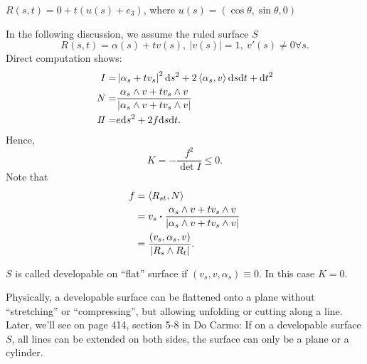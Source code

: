 \begin{example}
    \(R(s,t)=0+t\left(u(s)+e_3\right)\), where \(u(s)=\left(
        \cos\theta,\sin\theta,0
    \right)\)
    \begin{center}
    \end{center}
\end{example}
In the following discussion, we assume the ruled surface \(S\)
\[
    R(s,t)=\alpha(s)+t v(s),~|v(s)|=1,~v'(s)\neq 0\forall s.    
\]
Direct computation shows:
\begin{align*}
    I=&\left|\alpha_s+t v_s\right|^2\dd s^2+2\left\langle
        \alpha_s,v
    \right\rangle \dd s\dd t
    +\dd t^2\\
    N=&\frac{\alpha_s\wedge v+t v_s \wedge v}{
        \left|\alpha_s\wedge v+t v_s \wedge v\right|
    }\\
    I\!I=&e\dd s^2+2f \dd s \dd t .
\end{align*}
Hence,
\[
    K=-\frac{f^2}{\det I}\le 0.    
\]
Note that 
\begin{align*}
    f&=\left\langle R_{st},N\right\rangle\\
    &=v_s\vdot \frac{\alpha_s\wedge v+t v_s \wedge v}{
        \left|\alpha_s\wedge v+t v_s \wedge v\right|
    }\\
    &=\frac{\left(v_s,\alpha_s,v\right)}{\left|R_s\wedge R_t\right|}.
\end{align*}
\begin{definition}
    \(S\) is called developable on ``flat'' surface if \(\left(
        v_s,v,\alpha_s
    \right)\equiv 0\). In this case \(K=0\).
\end{definition}
\begin{remark}
    Physically, a developable surface can be flattened onto a plane 
    without ``stretching'' or ``compressing'', but allowing unfolding
    or cutting along a line. Later, we'll see on page 414, section 5-8
    in Do Carmo: If on a developable surface \(S\), all lines can be 
    extended on both sides, the surface can only be a plane 
    or a cylinder.
\end{remark}
